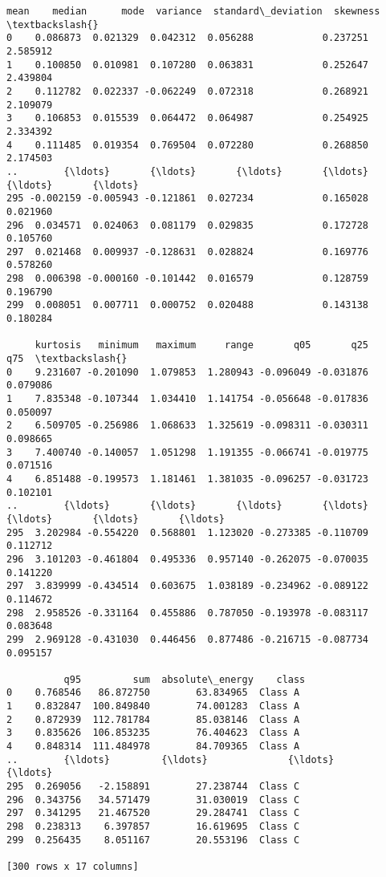 \documentclass[11pt]{article}
\makeatletter
\newcommand{\boxspacing}{\kern\kvtcb@left@rule\kern\kvtcb@boxsep}
\newcommand{\prompt}[4]{
        {\ttfamily\llap{{\color{#2}[#3]:\hspace{3pt}#4}}\vspace{-\baselineskip}}
    }
\makeatother
\begin{document}
            \begin{tcolorbox}[breakable, size=fbox, boxrule=.5pt, pad at break*=1mm, opacityfill=0]
\prompt{Out}{outcolor}{60}{\boxspacing}
\begin{Verbatim}[commandchars=\\\{\}]
         mean    median      mode  variance  standard\_deviation  skewness  \textbackslash{}
0    0.086873  0.021329  0.042312  0.056288            0.237251  2.585912
1    0.100850  0.010981  0.107280  0.063831            0.252647  2.439804
2    0.112782  0.022337 -0.062249  0.072318            0.268921  2.109079
3    0.106853  0.015539  0.064472  0.064987            0.254925  2.334392
4    0.111485  0.019354  0.769504  0.072280            0.268850  2.174503
..        {\ldots}       {\ldots}       {\ldots}       {\ldots}                 {\ldots}       {\ldots}
295 -0.002159 -0.005943 -0.121861  0.027234            0.165028  0.021960
296  0.034571  0.024063  0.081179  0.029835            0.172728  0.105760
297  0.021468  0.009937 -0.128631  0.028824            0.169776  0.578260
298  0.006398 -0.000160 -0.101442  0.016579            0.128759  0.196790
299  0.008051  0.007711  0.000752  0.020488            0.143138  0.180284

     kurtosis   minimum   maximum     range       q05       q25       q75  \textbackslash{}
0    9.231607 -0.201090  1.079853  1.280943 -0.096049 -0.031876  0.079086
1    7.835348 -0.107344  1.034410  1.141754 -0.056648 -0.017836  0.050097
2    6.509705 -0.256986  1.068633  1.325619 -0.098311 -0.030311  0.098665
3    7.400740 -0.140057  1.051298  1.191355 -0.066741 -0.019775  0.071516
4    6.851488 -0.199573  1.181461  1.381035 -0.096257 -0.031723  0.102101
..        {\ldots}       {\ldots}       {\ldots}       {\ldots}       {\ldots}       {\ldots}       {\ldots}
295  3.202984 -0.554220  0.568801  1.123020 -0.273385 -0.110709  0.112712
296  3.101203 -0.461804  0.495336  0.957140 -0.262075 -0.070035  0.141220
297  3.839999 -0.434514  0.603675  1.038189 -0.234962 -0.089122  0.114672
298  2.958526 -0.331164  0.455886  0.787050 -0.193978 -0.083117  0.083648
299  2.969128 -0.431030  0.446456  0.877486 -0.216715 -0.087734  0.095157

          q95         sum  absolute\_energy    class
0    0.768546   86.872750        63.834965  Class A
1    0.832847  100.849840        74.001283  Class A
2    0.872939  112.781784        85.038146  Class A
3    0.835626  106.853235        76.404623  Class A
4    0.848314  111.484978        84.709365  Class A
..        {\ldots}         {\ldots}              {\ldots}      {\ldots}
295  0.269056   -2.158891        27.238744  Class C
296  0.343756   34.571479        31.030019  Class C
297  0.341295   21.467520        29.284741  Class C
298  0.238313    6.397857        16.619695  Class C
299  0.256435    8.051167        20.553196  Class C

[300 rows x 17 columns]
\end{Verbatim}
\end{tcolorbox}
        
\end{document}
